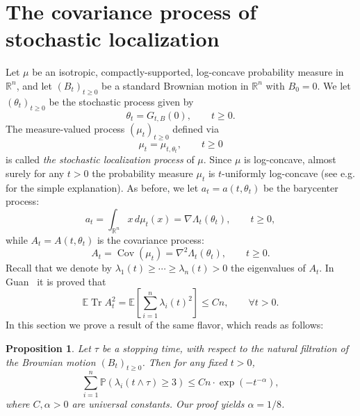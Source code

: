 \documentclass[12pt,a4paper]{article}
\newcommand{\Tr}{\mathop{\mathrm{Tr}}\nolimits}
\newcommand{\E}{\mathbb{E}}
\newcommand{\prob}{\mathbb{P}}
\newcommand{\RR}{\mathbb{R}}
\newcommand{\R}{\mathbb{R}}
\newcommand{\cov}{\mathop{\mathrm{Cov}}\nolimits}
\newcommand{\id}{\mathrm{Id}}
\newtheorem{proposition}[theorem]{Proposition}
\theoremstyle{definition}
\begin{document}


\section{The covariance process of stochastic localization}
\label{sec4}

Let $\mu$ be an  isotropic, compactly-supported, log-concave probability measure in $\RR^n$,
and let $(B_t)_{t \geq 0}$ be a standard Brownian motion in $\R^n$ with $B_0 = 0$.
We let $(\theta_t)_{t \geq 0}$ be the stochastic process given by
\[
\theta_t = G_{t,B} (0) , \qquad  t \geq 0.
\]
The measure-valued process $(\mu_t)_{t \geq 0}$ defined via
\[
\mu_t = \mu_{t,\theta_t} , \qquad t \geq 0
\]
is called \emph{the stochastic localization process} of $\mu$.
Since $\mu$ is
log-concave, almost surely for any $t > 0$ the probability measure $\mu_t$ is  $t$-uniformly log-concave (see e.g. \cite{K_root} for the simple explanation). As before, we let $a_t = a(t, \theta_t)$ be the barycenter process:
\[
a_t = \int_{\R^n} x \, d \mu_t (x) = \nabla \Lambda_t ( \theta_t ) ,
\qquad  t\geq 0,
\]
while $A_t = A(t, \theta_t)$ is the covariance process:
\[
A_t = \cov ( \mu_t ) = \nabla^2 \Lambda_t ( \theta_t ) , \qquad t\geq  0.
\]
%
Recall that we denote by $\lambda_1 (t) \geq \dotsb \geq \lambda_n (t)>0$ the eigenvalues of $A_t$. In Guan~\cite{guan} it is proved that
\begin{equation}\label{eq_guan}
\E \Tr A_t^2 = \E \left[ \sum_{i=1}^n \lambda_i (t)^2 \right] \leq C n , \qquad \forall t >0 .
\end{equation}
%
In this section we prove a result of the same flavor, which reads as follows:
%
\begin{proposition} \label{prop_vnis}
Let $\tau$ be a stopping time, with respect to the natural filtration of the Brownian motion $(B_t)_{t \geq 0}$.
Then for any fixed $t > 0$,
\[
\sum_{i=1}^n \prob ( \lambda_i (t\wedge \tau ) \geq 3 )
\leq C n \cdot \exp ( - t^{-\alpha} ) ,
\]
where $C, \alpha > 0$ are universal constants.
Our proof yields $\alpha = 1/8$.
\end{proposition}
\end{document}

